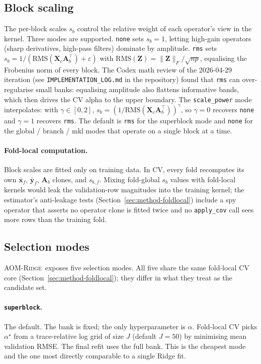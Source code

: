 \documentclass[11pt,a4paper]{article}
\newcommand{\Xmat}{\mathbf{X}}
\newcommand{\Amat}{\mathbf{A}}
\newcommand{\Zmat}{\mathbf{Z}}
\newcommand{\xvec}{\mathbf{x}}
\newcommand{\yvec}{\mathbf{y}}
\newcommand{\AOMR}{\textsc{AOM-Ridge}\xspace}
\begin{document}
\subsection{Block scaling}\label{sec:method-blockscale}

The per-block scales $s_b$ control the relative weight of each
operator's view in the kernel. Three modes are supported.
\texttt{none} sets $s_b=1$, letting high-gain operators (sharp
derivatives, high-pass filters) dominate by amplitude. \texttt{rms}
sets $s_b=1/(\mathrm{RMS}(\Xmat_c\Amat_b^\top)+\varepsilon)$ with
$\mathrm{RMS}(\Zmat)=\|\Zmat\|_F/\sqrt{np}$, equalising the Frobenius
norm of every block. The Codex math review of the 2026-04-29 iteration
(see \texttt{IMPLEMENTATION\_LOG.md} in the repository) found that
\texttt{rms} can over-regularise small banks: equalising amplitude
also flattens informative bands, which then drives the CV alpha to
the upper boundary. The \texttt{scale\_power} mode interpolates: with
$\gamma\in[0,2]$, $s_b=(1/\mathrm{RMS}(\Xmat_c\Amat_b^\top))^{\gamma}$,
so $\gamma=0$ recovers \texttt{none} and $\gamma=1$ recovers
\texttt{rms}. The default is \texttt{rms} for the superblock mode and
\texttt{none} for the global / branch / mkl modes that operate on a
single block at a time.

\paragraph{Fold-local computation.}
Block scales are fitted only on training data. In CV, every fold
recomputes its own $\bar{\xvec}_f$, $\bar{\yvec}_f$, $\Amat_b$ clones,
and $s_{b,f}$. Mixing fold-global $s_b$ values with fold-local kernels
would leak the validation-row magnitudes into the training kernel; the
estimator's anti-leakage tests (Section~\ref{sec:method-foldlocal})
include a spy operator that asserts no operator clone is fitted twice
and no \texttt{apply\_cov} call sees more rows than the training fold.

\subsection{Selection modes}\label{sec:method-selection}

\AOMR\ exposes five selection modes. All five share the same
fold-local CV core (Section~\ref{sec:method-foldlocal}); they differ
in what they treat as the candidate set.

\paragraph{\texttt{superblock}.}
The default. The bank is fixed; the only hyperparameter is $\alpha$.
Fold-local CV picks $\alpha^\star$ from a trace-relative log grid of
size $J$ (default $J=50$) by minimising mean validation RMSE. The
final refit uses the full bank. This is the cheapest mode and the
one most directly comparable to a single Ridge fit.
\end{document}
